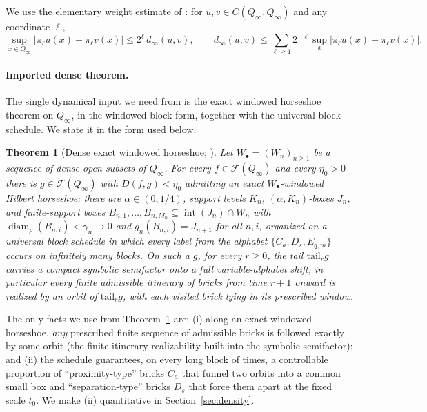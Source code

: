 \documentclass[11pt]{article}
\newtheorem{theorem}{Theorem}[section]
\newcommand{\Q}{Q_\infty}
\newcommand{\F}{\mathcal{F}}
\newcommand{\diam}{\operatorname{diam}}
\begin{document}
We use the elementary weight estimate of \cite[Eq.~(2.2)]{companion}: for
$u,v\in C(\Q,\Q)$ and any coordinate $\ell$,
\begin{equation}\label{eq:weight}
\sup_{x\in\Q}\bigl|\pi_\ell u(x)-\pi_\ell v(x)\bigr|\le2^{\ell}\,d_\infty(u,v),
\qquad
d_\infty(u,v)\le\sum_{\ell\ge1}2^{-\ell}\sup_x|\pi_\ell u(x)-\pi_\ell v(x)|.
\end{equation}

\paragraph{Imported dense theorem.}
The single dynamical input we need from \cite{Shmalo2026} is the exact windowed
horseshoe theorem on $\Q$, in the windowed-block form, together with the universal block
schedule.  We state it in the form used below.

\begin{theorem}[{Dense exact windowed horseshoe; \cite[Theorem~3.6 and \S12]{Shmalo2026}}]\label{thm:dense}
Let $W_\bullet=(W_n)_{n\ge1}$ be a sequence of dense open subsets of $\Q$.  For every
$f\in\F(\Q)$ and every $\eta_0>0$ there is $g\in\F(\Q)$ with $D(f,g)<\eta_0$ admitting
an exact $W_\bullet$-windowed Hilbert horseshoe: there are $\alpha\in(0,1/4)$, support
levels $K_n$, $(\alpha,K_n)$-boxes $J_n$, and finite-support boxes
$B_{n,1},\dots,B_{n,M_n}\subseteq\operatorname{int}(J_n)\cap W_n$ with
$\diam_\rho(B_{n,i})<\gamma_n\to0$ and $g_n(B_{n,i})=J_{n+1}$ for all $n,i$, organized on
a universal block schedule in which every label from the alphabet
$\{C_a,D_s,E_{q,m}\}$ occurs on infinitely many blocks.  On such a $g$, for every
$r\ge0$, the tail $\mathrm{tail}_rg$ carries a compact symbolic semifactor onto a full
variable-alphabet shift; in particular every finite admissible itinerary of bricks from
time $r+1$ onward is realized by an orbit of $\mathrm{tail}_rg$, with each visited brick
lying in its prescribed window.
\end{theorem}

The only facts we use from Theorem~\ref{thm:dense} are: (i) along an exact windowed
horseshoe, \emph{any} prescribed finite sequence of admissible bricks is followed
exactly by some orbit (the finite-itinerary realizability built into the symbolic
semifactor); and (ii) the schedule guarantees, on every long block of times, a
controllable proportion of ``proximity-type'' bricks $C_a$ that funnel two orbits into a
common small box and ``separation-type'' bricks $D_s$ that force them apart at the fixed
scale $t_0$.  We make (ii) quantitative in Section~\ref{sec:density}.
\end{document}
